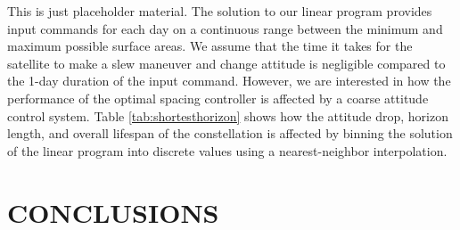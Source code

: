 \documentclass[letterpaper, 10 pt, conference]{ieeeconf}  %
\begin{document}
This is just placeholder material. The solution to our linear program provides input commands for each day on a continuous range between the minimum and maximum possible surface areas. We assume that the time it takes for the satellite to make a slew maneuver and change attitude is negligible compared to the 1-day duration of the input command. However, we are interested in how the performance of the optimal spacing controller is affected by a coarse attitude control system. Table \ref{tab:shortesthorizon} shows how the attitude drop, horizon length, and overall lifespan of the constellation is affected by binning the solution of the linear program into discrete values using a nearest-neighbor interpolation.

\fi

\section{CONCLUSIONS}
\end{document}
